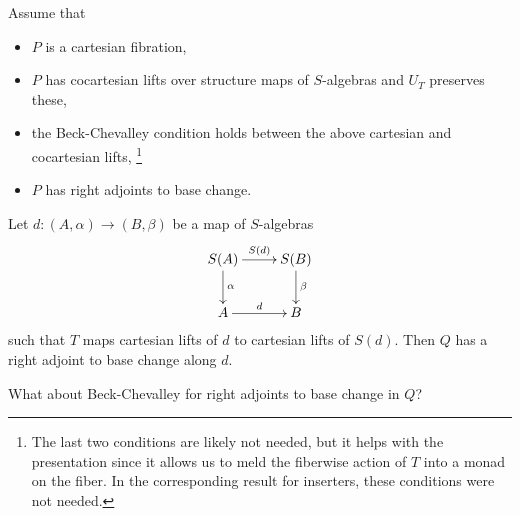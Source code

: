 \documentclass[reqno,10pt,a4paper,oneside]{amsart}
\begin{document}
\begin{lemma}
\label{Alg-preserves-right-adjoint-to-base-change}
Assume that
\begin{itemize}
\item
$P$ is a cartesian fibration,
\item
$P$ has cocartesian lifts over structure maps of $S$-algebras and $U_T$ preserves these,
\item
the Beck-Chevalley condition holds between the above cartesian and cocartesian lifts,%
\footnote{
  The last two conditions are likely not needed, but it helps with the presentation since it allows us to meld the fiberwise action of $T$ into a monad on the fiber.
  In the corresponding result for inserters, these conditions were not needed.
}
\item
$P$ has right adjoints to base change.
\end{itemize}
Let $d : (A, \alpha) \to (B, \beta)$ be a map of $S$-algebras
\[
\xymatrix{
  S(A)
  \ar[r]^{S(d)}
  \ar[d]^{\alpha}
&
  S(B)
  \ar[d]^{\beta}
\\
  A
  \ar[r]^{d}
&
  B
}
\]
such that $T$ maps cartesian lifts of $d$ to cartesian lifts of $S(d)$.
Then $Q$ has a right adjoint to base change along $d$.
\end{lemma}

\begin{question}
What about Beck-Chevalley for right adjoints to base change in $Q$?
\end{question}
\end{document}
